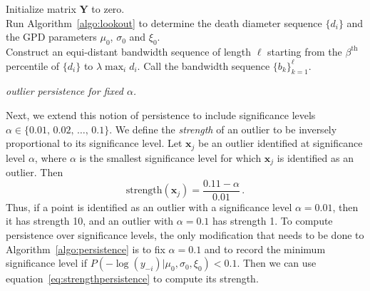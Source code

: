 \documentclass[letter,12pt]{article}
\begin{document}
\DontPrintSemicolon
\begin{algorithm}\fontsize{11}{12}\selectfont
    Initialize matrix $\bm{Y}$ to zero. \\	
	 Run Algorithm~\ref{algo:lookout} to determine the death diameter sequence $\{d_i\}$ and the GPD parameters $\mu_0$, $\sigma_0$ and $\xi_0$. \\
     Construct an equi-distant bandwidth sequence of length $\ell$ starting from the $\beta^{\text{th}}$ percentile of $\{d_i\}$ to $ \lambda \max_i d_i$. Call the bandwidth sequence $\{b_k\}_{k=1}^{\ell}$. \\
	\caption{\itshape outlier persistence for fixed $\alpha$.}
	\label{algo:persistence}
\end{algorithm}


Next, we extend this notion of persistence to include significance levels $\alpha \in \{0.01, \, 0.02, \, \ldots, \, 0.1 \}$.
We define the \textit{strength} of an outlier to be inversely proportional to its significance level. Let $\bm{x}_j$ be an outlier identified at significance level $\alpha$, where $\alpha$ is the smallest significance level for which $\bm{x}_j$ is identified as an outlier. Then 
\begin{equation}\label{eq:strengthpersistence}
    \text{strength} \left( \bm{x}_j \right) = \frac{0.11 - \alpha}{0.01}  \, .
\end{equation}
Thus, if a point is identified as an outlier with a significance level  $ \alpha = 0.01$, then it has  strength  10, and  an outlier with $\alpha = 0.1$ has strength 1. To compute persistence over significance levels, the only modification that needs to be done to Algorithm~\ref{algo:persistence} is to fix $\alpha = 0.1$ and to record the minimum significance level   %
if $P\left(-\log(y_{-i})|\mu_0, \sigma_0, \xi_0 \right) < 0.1$. 
Then we can use equation~\eqref{eq:strengthpersistence} to compute its strength. 
\end{document}
